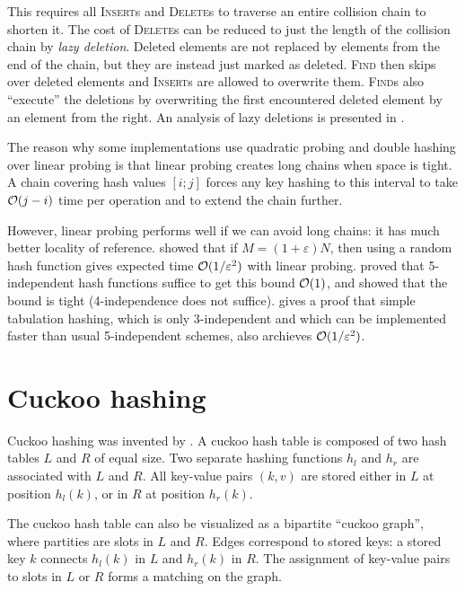 This requires all \textsc{Insert}s and \textsc{Delete}s to traverse an entire
collision chain to shorten it. The cost of \textsc{Delete}s can be reduced to
just the length of the collision chain by \emph{lazy deletion}. Deleted elements
are not replaced by elements from the end of the chain, but they are instead
just marked as deleted. \textsc{Find} then skips over deleted elements and
\textsc{Insert}s are allowed to overwrite them.
\textsc{Find}s also ``execute'' the deletions by overwriting the first
encountered deleted element by an element from the right. An analysis
of lazy deletions is presented in \cite{lazy-deletions}.

The reason why some implementations use quadratic probing and double hashing
over linear probing is that linear probing creates long chains when space is
tight. A chain covering hash values $[i;j]$ forces any key hashing to this
interval to take $\mathcal{O}(j-i)$ time per operation and to extend the chain further.

However, linear probing performs well if we can avoid long chains: it has
much better locality of reference.
\cite{knuth-linear} showed that if $M=(1+\varepsilon) N$, then using a random
hash function gives expected time $\mathcal{O}(1/\varepsilon^2)$ with linear probing.
\cite{linear-probing-ci} proved that 5-independent hash functions suffice
to get this bound $\mathcal{O}(1)$, and \cite{linear-probing-constant}
showed that the bound is tight (4-independence does not suffice).
\cite{power-of-simple-tab} gives a proof that simple tabulation hashing,
which is only 3-independent and which can be implemented faster than usual
5-independent schemes, also archieves $\mathcal{O}(1/\varepsilon^2)$.

\section{Cuckoo hashing}
\label{sec:cuckoo}

Cuckoo hashing was invented by \cite{cuckoo-hashing}.
A cuckoo hash table is composed of two hash tables $L$ and $R$ of equal size.
Two separate hashing functions $h_l$ and $h_r$ are associated with $L$ and $R$.
All key-value pairs $(k,v)$ are stored either in $L$ at position $h_l(k)$, or
in $R$ at position $h_r(k)$.

The cuckoo hash table can also be visualized as a bipartite ``cuckoo graph'',
where partities are slots in $L$ and $R$. Edges correspond to stored keys:
a stored key $k$ connects $h_l(k)$ in $L$ and $h_r(k)$ in $R$. The assignment
of key-value pairs to slots in $L$ or $R$ forms a matching on the graph.

